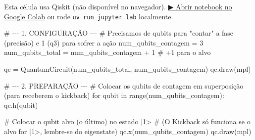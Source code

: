 \documentclass[
  brazilian,
]{report}
\newenvironment{Shaded}{\begin{snugshade}}{\end{snugshade}}
\newcommand{\CommentTok}[1]{\textcolor[rgb]{0.37,0.37,0.37}{#1}}
\newcommand{\DecValTok}[1]{\textcolor[rgb]{0.68,0.00,0.00}{#1}}
\newcommand{\NormalTok}[1]{\textcolor[rgb]{0.00,0.23,0.31}{#1}}
\newcommand{\OperatorTok}[1]{\textcolor[rgb]{0.37,0.37,0.37}{#1}}
\newcommand{\StringTok}[1]{\textcolor[rgb]{0.13,0.47,0.30}{#1}}
\begin{document}
\begin{tcolorbox}[enhanced jigsaw, arc=.35mm, bottomrule=.15mm, bottomtitle=1mm, breakable, colback=white, colbacktitle=quarto-callout-warning-color!10!white, colframe=quarto-callout-warning-color-frame, coltitle=black, left=2mm, leftrule=.75mm, opacityback=0, opacitybacktitle=0.6, rightrule=.15mm, title=\textcolor{quarto-callout-warning-color}{\faExclamationTriangle}\hspace{0.5em}{⚛️ Célula Qiskit --- execute no Colab ou localmente}, titlerule=0mm, toprule=.15mm, toptitle=1mm]

Esta célula usa Qiskit (não disponível no navegador).
\href{https://colab.research.google.com/github/maxwellamaral/aula-quantum/blob/main/notebooks/07-quantum-fourier-transform.ipynb}{▶
Abrir notebook no Google Colab} ou rode \texttt{uv\ run\ jupyter\ lab}
localmente.

\begin{Shaded}
\begin{Highlighting}[]

\CommentTok{\# {-}{-}{-} 1. CONFIGURAÇÃO {-}{-}{-}}
\CommentTok{\# Precisamos de qubits para "contar" a fase (precisão) e 1 (q3) para sofrer a ação}
\NormalTok{num\_qubits\_contagem }\OperatorTok{=} \DecValTok{3} 
\NormalTok{num\_qubits\_total }\OperatorTok{=}\NormalTok{ num\_qubits\_contagem }\OperatorTok{+} \DecValTok{1} \CommentTok{\# +1 para o alvo}

\NormalTok{qc }\OperatorTok{=}\NormalTok{ QuantumCircuit(num\_qubits\_total, num\_qubits\_contagem)}
\NormalTok{qc.draw(}\StringTok{\textquotesingle{}mpl\textquotesingle{}}\NormalTok{)}
\end{Highlighting}
\end{Shaded}

\end{tcolorbox}

\begin{Shaded}
\begin{Highlighting}[]

\NormalTok{\# {-}{-}{-} 2. PREPARAÇÃO {-}{-}{-}}
\NormalTok{\# Colocar os qubits de contagem em superposição (para receberem o kickback)}
\NormalTok{for qubit in range(num\_qubits\_contagem):}
\NormalTok{    qc.h(qubit)}

\NormalTok{\# Colocar o qubit alvo (o último) no estado |1\textgreater{}}
\NormalTok{\# (O Kickback só funciona se o alvo for |1\textgreater{}, lembre{-}se do eigenstate)}
\NormalTok{qc.x(num\_qubits\_contagem)}
\NormalTok{qc.draw(\textquotesingle{}mpl\textquotesingle{})}
\end{Highlighting}
\end{Shaded}
\end{document}
